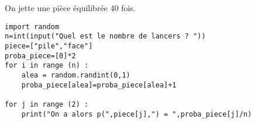 
On jette une pièce équilibrée 40 fois.

 

\begin{center}
\begin{lstlisting}
import random
n=int(input("Quel est le nombre de lancers ? "))
piece=["pile","face"]
proba_piece=[0]*2
for i in range (n) :
    alea = random.randint(0,1)
    proba_piece[alea]=proba_piece[alea]+1
    
for j in range (2) :
    print("On a alors p(",piece[j],") = ",proba_piece[j]/n)
\end{lstlisting}
\end{center}
 
 